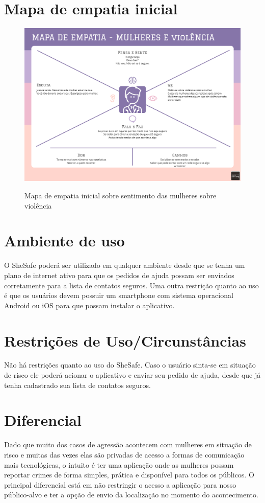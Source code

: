 \section{Mapa de empatia inicial}
\begin{figure}[htbp]
  \begin{center}
  \includegraphics[width=.9\linewidth]{images/mapa-empatia-inicial.png}\\
  \end{center}
  \caption[Mapa de empatia inicial]{Mapa de empatia inicial sobre sentimento das mulheres sobre violência}
  \label{fig:mapa-empatia=inicial}
\end{figure}

\section{Ambiente de uso}
O SheSafe poderá ser utilizado em qualquer ambiente desde que se tenha um plano de internet ativo para que os pedidos de ajuda possam ser enviados corretamente para a lista de contatos seguros. Uma outra restrição quanto ao uso é que os usuários devem possuir um smartphone com sistema operacional Android ou iOS para que possam instalar o aplicativo.

\section{Restrições de Uso/Circunstâncias}
Não há restrições quanto ao uso do SheSafe. Caso o usuário sinta-se em situação de risco ele poderá acionar o aplicativo e enviar seu pedido de ajuda, desde que já tenha cadastrado sua lista de contatos seguros.

\section{Diferencial}
Dado que muito dos casos de agressão acontecem com mulheres em situação de risco e muitas das vezes elas são privadas de acesso a formas de comunicação mais tecnológicas, o intuito é ter uma aplicação onde as mulheres possam reportar crimes de forma simples, prática e disponível para todos os públicos. O principal diferencial está em não restringir o acesso a aplicação para nosso público-alvo e ter a opção de envio da localização no momento do acontecimento.

